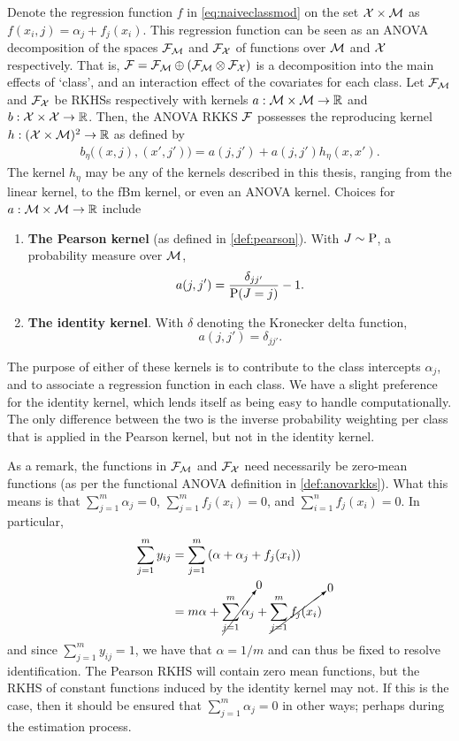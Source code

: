 Denote the regression function $f$ in \cref{eq:naiveclassmod} on the set ${\mathcal X}\times{\mathcal M}$ as $f(x_i,j) = \alpha_j + f_j(x_i)$.
This regression function can be seen as an ANOVA decomposition of the spaces ${\mathcal F}_{\mathcal M}$ and ${\mathcal F}_{\mathcal X}$ of functions over ${\mathcal M}$ and ${\mathcal X}$ respectively. 
That is, ${\mathcal F} = {\mathcal F}_{\mathcal M} \oplus ({\mathcal F}_{\mathcal M} \otimes {\mathcal F}_{\mathcal X})$ is a decomposition into the main effects of `class', and an interaction effect of the covariates for each class.
Let ${\mathcal F}_{\mathcal M}$ and ${\mathcal F}_{\mathcal X}$ be RKHSs respectively with kernels $a:{\mathcal M}\times{\mathcal M}\to\mathbb{R}$ and $b:{\mathcal X}\times{\mathcal X}\to\mathbb{R}$.
Then, the ANOVA RKKS ${\mathcal F}$ possesses the reproducing kernel $h:({\mathcal X} \times {\mathcal M})^2 \to \mathbb{R}$ as defined by
\begin{align}\label{eq:anovaclass}
  b_\eta\big( (x,j), (x',j') \big) = a(j,j') + a(j,j')h_\eta(x,x').  
\end{align}
The kernel $h_\eta$ may be any of the kernels described in this thesis, ranging from the linear kernel, to the fBm kernel, or even an ANOVA kernel.
Choices for $a:{\mathcal M} \times {\mathcal M} \to \mathbb{R}$ include 
\begin{enumerate}
  \item \textbf{The Pearson kernel} (as defined in \cref{def:pearson}). With $J\sim\operatorname{P}$, a probability measure over ${\mathcal M}$,
  \[
    a(j,j') = \frac{\delta_{jj'}}{\operatorname{P}(J=j)} - 1.
  \]
  \item \textbf{The identity kernel}. With $\delta$ denoting the Kronecker delta function,
  \[
    a(j,j') = \delta_{jj'}.
  \]
\end{enumerate}
The purpose of either of these kernels is to contribute to the class intercepts $\alpha_j$, and to associate a regression function in each class.
We have a slight preference for the identity kernel, which lends itself as being easy to handle computationally.
The only difference between the two is the inverse probability weighting per class that is applied in the Pearson kernel, but not in the identity kernel.

As a remark, the functions in ${\mathcal F}_{\mathcal M}$ and ${\mathcal F}_{\mathcal X}$ need necessarily be zero-mean functions (as per the functional ANOVA definition in \cref{def:anovarkks}).
What this means is that $\sum_{j=1}^m \alpha_j = 0$, $\sum_{j=1}^m f_j(x_i) = 0$, and $\sum_{i=1}^n f_j(x_i) = 0$.
In particular,
\begin{align*}
  \sum_{j=1}^m y_{ij} 
  &= \sum_{j=1}^m \left(\alpha + \alpha_j + f_j(x_i) \right) \\
  &= m\alpha + \cancelto{0}{\sum_{j=1}^m \alpha_j} + \cancelto{0}{\sum_{j=1}^m f_j(x_i)}
\end{align*}
and since $\sum_{j=1}^m y_{ij} = 1$, we have that $\alpha = 1/m$ and can thus be fixed to resolve identification.
The Pearson RKHS will contain zero mean functions, but the RKHS of constant functions induced by the identity kernel may not.
If this is the case, then it should be ensured that $\sum_{j=1}^m \alpha_j =0$ in other ways; perhaps during the estimation process.

